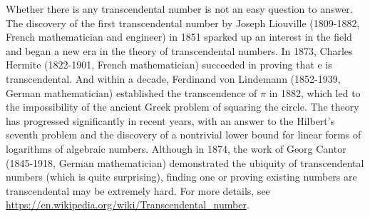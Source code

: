 \documentclass{article}
\begin{document}
\begin{tcolorbox}
  Whether there is any transcendental number is not an easy question to answer. 
  The discovery of the first transcendental number by Joseph Liouville (1809-1882, French mathematician and engineer) in 1851 sparked up an interest in the field and began a new era in the theory of transcendental numbers. 
  In 1873, Charles Hermite (1822-1901, French mathematician) succeeded in proving that e is transcendental. And within a decade, Ferdinand von Lindemann (1852-1939, German mathematician) established the transcendence of $ \pi $ in 1882, which led to the impossibility of the ancient Greek problem of squaring the circle. 
  The theory has progressed significantly in recent years, with an answer to the Hilbert's seventh problem and the discovery of a nontrivial lower bound for linear forms of logarithms of algebraic numbers. 
  Although in 1874, the work of Georg Cantor (1845-1918, German mathematician) demonstrated the ubiquity of transcendental numbers (which is quite surprising), finding one or proving existing numbers are transcendental may be extremely hard. 
  For more details, see \url{https://en.wikipedia.org/wiki/Transcendental_number}.
\end{tcolorbox}
\end{document}
